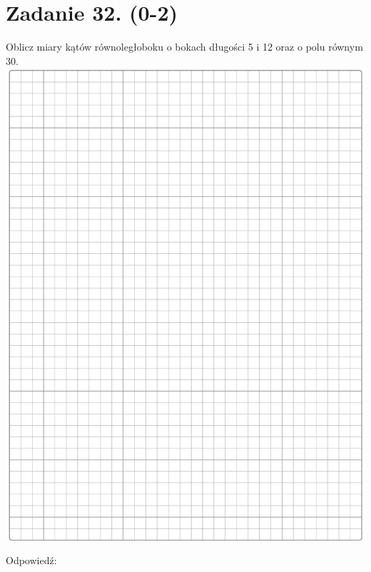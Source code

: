 \documentclass[10pt]{article}
\begin{document}
\section*{Zadanie 32. (0-2)}
Oblicz miary kątów równoległoboku o bokach długości 5 i 12 oraz o polu równym 30.\\
\includegraphics[max width=\textwidth, center]{2024_11_21_cdea326d19d0c2132b88g-15}

Odpowiedź:
\end{document}
